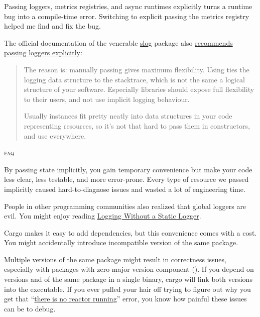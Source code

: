 \documentclass{article}
\begin{document}
Passing loggers, metrics registries, and async runtimes explicitly turns a runtime bug into a compile-time error.
Switching to explicit passing the metrics registry helped me find and fix the bug.

The official documentation of the venerable \href{https://crates.io/crates/slog}{slog} package also \href{https://github.com/slog-rs/slog/wiki/FAQ#do-i-have-to-pass-logger-around}{recommends passing loggers explicitly}:

\blockquote{
  The reason is: manually passing  gives maximum flexibility.
  Using  ties the logging data structure to the stacktrace, which is not the same a logical structure of your software.
  Especially libraries should expose full flexibility to their users, and not use implicit logging behaviour.

  Usually  instances fit pretty neatly into data structures in your code representing resources, so it's not that hard to pass them in constructors, and use  everywhere. 
}{\href{https://github.com/slog-rs/slog/wiki/FAQ#do-i-have-to-pass-logger-around}{ \textsc{faq}}}

By passing state implicitly, you gain temporary convenience but make your code less clear, less testable, and more error-prone.
Every type of resource we passed implicitly caused hard-to-diagnose issues and wasted a lot of engineering time.

People in other programming communities also realized that global loggers are evil.
You might enjoy reading \href{https://www.yegor256.com/2019/03/19/logging-without-static-logger.html}{Logging Without a Static Logger}.


Cargo makes it easy to add dependencies, but this convenience comes with a cost.
You might accidentally introduce incompatible version of the same package.

Multiple versions of the same package might result in correctness issues, especially with packages with zero major version component ().
If you depend on versions  and  of the same package in a single binary, cargo will link both versions into the executable.
If you ever pulled your hair off trying to figure out why you get that ``\href{https://github.com/awslabs/aws-lambda-rust-runtime/issues/266}{there is no reactor running}'' error, you know how painful these issues can be to debug.
\end{document}
